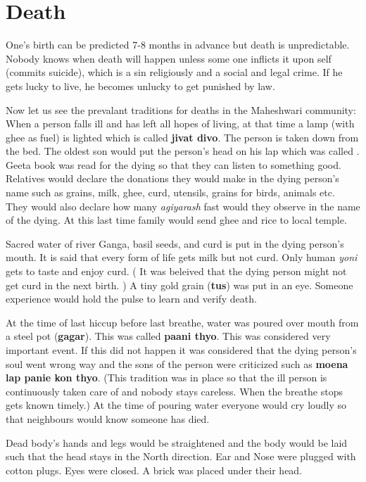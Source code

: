 \section{Death} 
One's birth can be predicted 7-8 months in advance but death is unpredictable.
Nobody knows when death will happen unless some one inflicts it upon self
(commits suicide), which is a sin religiously and a social and legal crime. If
he gets lucky to live, he becomes unlucky to get punished by law.

Now let us see the prevalant traditions for deaths in the Maheshwari community:
When a person falls ill and has left all hopes of living, at that time a lamp
(with ghee as fuel) is lighted which is called \textbf{jivat divo}. The person
is taken down from the bed. The oldest son would put the person's head on his
lap which was called . Geeta book was read for the dying so
that they can listen to something good. Relatives would declare the donations
they would make in the dying person's name such as grains, milk, ghee, curd,
utensils, grains for birds, animals etc. They would also declare how many
\textit{agiyarash} fast would they observe in the name of the dying. At this
last time family would send ghee and rice to local temple.

Sacred water of river Ganga, basil seeds, and curd is put in the dying person's
mouth. It is said that every form of life gets milk but not curd. Only human
\textit{yoni} gets to taste and enjoy curd. ( It was beleived that the dying
person might not get curd in the next birth. ) A tiny gold grain (\textbf{tus})
was put in an eye. Someone experience would hold the pulse to learn and verify
death.

At the time of last hiccup before last breathe, water was poured over mouth
from a steel pot (\textbf{gagar}). This was called \textbf{paani thyo}. This
was considered very important event. If  this did not happen it was considered
that the dying person's soul went wrong way and the sons of the person were
criticized such as \textbf{moena lap panie kon thyo}. (This tradition was in
place so that the ill person is continuously taken care of and nobody stays
careless. When the breathe stops gets known timely.) At the time of pouring
water everyone would cry loudly so that neighbours would know someone has died.

Dead body's hands and legs would be straightened and the body would be laid
such that the head stays in the North direction. Ear and Nose were plugged with
cotton plugs. Eyes were closed. A brick was placed under their head.

